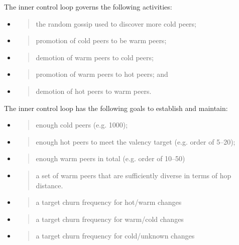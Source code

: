 \documentclass[11pt,a4paper]{article}
\begin{document}
The inner control loop governs the following activities:

\begin{itemize}
\item
  \begin{quote}
  the random gossip used to discover more cold peers;
  \end{quote}
\item
  \begin{quote}
  promotion of cold peers to be warm peers;
  \end{quote}
\item
  \begin{quote}
  demotion of warm peers to cold peers;
  \end{quote}
\item
  \begin{quote}
  promotion of warm peers to hot peers; and
  \end{quote}
\item
  \begin{quote}
  demotion of hot peers to warm peers.
  \end{quote}
\end{itemize}

The inner control loop has the following goals to establish and
maintain:

\begin{itemize}
\item
  \begin{quote}
  enough cold peers (e.g. 1000);
  \end{quote}
\item
  \begin{quote}
  enough hot peers to meet the valency target (e.g. order of 5--20);
  \end{quote}
\item
  \begin{quote}
  enough warm peers in total (e.g. order of 10--50)
  \end{quote}
\item
  \begin{quote}
  a set of warm peers that are sufficiently diverse in terms of hop
  distance.
  \end{quote}
\item
  \begin{quote}
  a target churn frequency for hot/warm changes
  \end{quote}
\item
  \begin{quote}
  a target churn frequency for warm/cold changes
  \end{quote}
\item
  \begin{quote}
  a target churn frequency for cold/unknown changes
  \end{quote}
\end{itemize}
\end{document}
